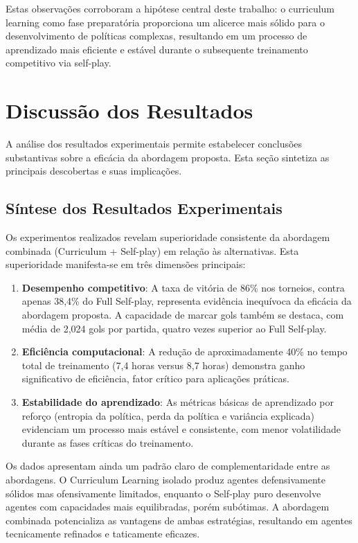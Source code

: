 Estas observações corroboram a hipótese central deste trabalho: o curriculum learning como fase preparatória proporciona um alicerce mais sólido para o desenvolvimento de políticas complexas, resultando em um processo de aprendizado mais eficiente e estável durante o subsequente treinamento competitivo via self-play.

\section{Discussão dos Resultados}
\label{sec:discussao_resultados}

A análise dos resultados experimentais permite estabelecer conclusões substantivas sobre a eficácia da abordagem proposta. Esta seção sintetiza as principais descobertas e suas implicações.

\subsection{Síntese dos Resultados Experimentais}

Os experimentos realizados revelam superioridade consistente da abordagem combinada (Curriculum + Self-play) em relação às alternativas. Esta superioridade manifesta-se em três dimensões principais:

\begin{enumerate}
    \item \textbf{Desempenho competitivo}: A taxa de vitória de 86\% nos torneios, contra apenas 38,4\% do Full Self-play, representa evidência inequívoca da eficácia da abordagem proposta. A capacidade de marcar gols também se destaca, com média de 2,024 gols por partida, quatro vezes superior ao Full Self-play.

    \item \textbf{Eficiência computacional}: A redução de aproximadamente 40\% no tempo total de treinamento (7,4 horas versus 8,7 horas) demonstra ganho significativo de eficiência, fator crítico para aplicações práticas.

    \item \textbf{Estabilidade do aprendizado}: As métricas básicas de aprendizado por reforço (entropia da política, perda da política e variância explicada) evidenciam um processo mais estável e consistente, com menor volatilidade durante as fases críticas do treinamento.
\end{enumerate}

Os dados apresentam ainda um padrão claro de complementaridade entre as abordagens. O Curriculum Learning isolado produz agentes defensivamente sólidos mas ofensivamente limitados, enquanto o Self-play puro desenvolve agentes com capacidades mais equilibradas, porém subótimas. A abordagem combinada potencializa as vantagens de ambas estratégias, resultando em agentes tecnicamente refinados e taticamente eficazes.

